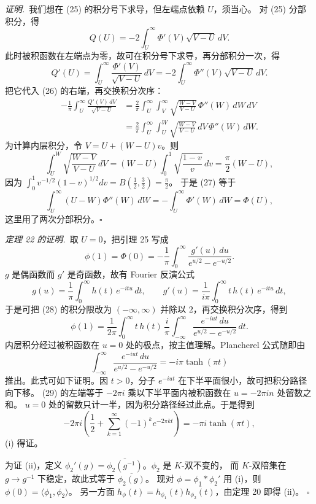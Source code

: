 \smallskip
\noindent\emph{证明.}\ 我们想在 (25) 的积分号下求导，但左端点依赖 $U$，须当心。
对 (25) 分部积分，得
\[
Q(U)=-2\int_{U}^{\infty}\Phi'(V)\sqrt{V-U}\,dV .
\]
此时被积函数在左端点为零，故可在积分号下求导，再分部积分一次，得
\[
Q'(U)=\int_{U}^{\infty}\frac{\Phi'(V)}{\sqrt{V-U}}\,dV
=-2\int_{U}^{\infty}\Phi''(V)\sqrt{V-U}\,dV .
\]
把它代入 (26) 的右端，再交换积分次序：
\[
\begin{aligned}
-\frac{1}{\pi}\int_{U}^{\infty}\frac{Q'(V)\,dV}{\sqrt{V-U}}
&=\frac{2}{\pi}\int_{U}^{\infty}\int_{V}^{\infty}
\sqrt{\frac{W-V}{V-U}}\,\Phi''(W)\,dW\,dV\\
&=\frac{2}{\pi}\int_{U}^{\infty}\int_{U}^{W}
\sqrt{\frac{W-V}{V-U}}\,dV\,\Phi''(W)\,dW .
\end{aligned}
\tag{27}
\]
为计算内层积分，令 $V=U+(W-U)v$。则
\[
\int_{U}^{W}\sqrt{\frac{W-V}{V-U}}\,dV=(W-U)\int_{0}^{1}\sqrt{\frac{1-v}{v}}\,dv
=\frac{\pi}{2}(W-U),
\]
因为 $\int_{0}^{1}v^{-1/2}(1-v)^{1/2}dv=B(\tfrac12,\tfrac32)=\tfrac{\pi}{2}$。
于是 (27) 等于
\[
\int_{U}^{\infty}(U-W)\Phi''(W)\,dW=-\int_{U}^{\infty}\Phi'(W)\,dW=\Phi(U),
\]
这里用了两次分部积分。\hfill$\square$

\smallskip
\noindent\emph{定理 22 的证明.}\ 取 $U=0$，把引理 25 写成
\begin{equation}\tag{28}
\phi(1)=\Phi(0)=-\frac{1}{\pi}\int_{0}^{\infty}
\frac{g'(u)\,du}{e^{u/2}-e^{-u/2}} .
\end{equation}
$g$ 是偶函数而 $g'$ 是奇函数，故有 Fourier 反演公式
\[
g(u)=\frac{1}{\pi}\int_{0}^{\infty}h(t)\,e^{-itu}\,dt,\qquad
g'(u)=\frac{1}{i\pi}\int_{0}^{\infty}t\,h(t)\,e^{-itu}\,dt,
\]
于是可把 (28) 的积分限改为 $(-\infty,\infty)$ 并除以 $2$，再交换积分次序，得到
\[
\phi(1)=\frac{1}{2\pi}\int_{0}^{\infty}t\,h(t)\,\frac{i}{\pi}
\int_{-\infty}^{\infty}\frac{e^{-iut}\,du}{e^{u/2}-e^{-u/2}}\,dt .
\]
内层积分经过被积函数在 $u=0$ 处的极点，按主值理解。Plancherel 公式随即由
\begin{equation}\tag{29}
\int_{-\infty}^{\infty}\frac{e^{-iut}\,du}{e^{u/2}-e^{-u/2}}=-i\pi\tanh(\pi t)
\end{equation}
推出。此式可如下证明。因 $t>0$，分子 $e^{-iut}$ 在下半平面很小，故可把积分路径向下移。
(29) 的左端等于 $-2\pi i$ 乘以下半平面内被积函数在 $u=-2\pi in$ 处留数之和。
$u=0$ 处的留数只计一半，因为积分路径经过此点。于是得到
\[
-2\pi i\left(\frac12+\sum_{k=1}^{\infty}(-1)^{k}e^{-2\pi kt}\right)=-\pi i\tanh(\pi t),
\]
(i) 得证。

为证 (ii)，定义 $\phi_{2}'(g)=\overline{\phi_{2}(g^{-1})}$。$\phi_{2}$ 是 $K$-双不变的，
而 $K$-双陪集在 $g\to g^{-1}$ 下稳定，故此式等于 $\overline{\phi_{2}(g)}$。
现对 $\phi=\phi_{1}*\phi_{2}'$ 用 (i)，则 $\phi(0)=\langle\phi_{1},\phi_{2}\rangle$。
另一方面 $h_{\phi}(t)=h_{\phi_{1}}(t)\overline{h_{\phi_{2}}(t)}$，由定理 20 即得 (ii)。
\hfill$\square$

